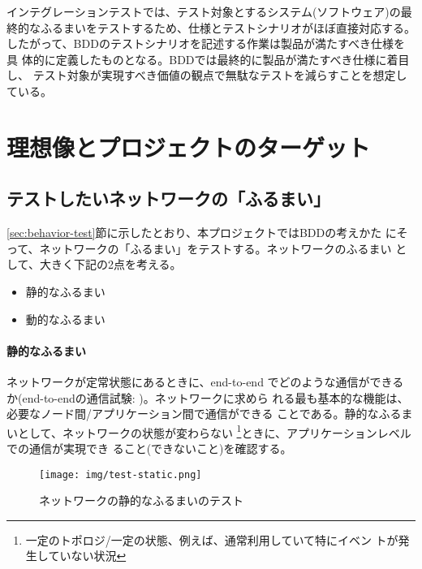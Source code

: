 インテグレーションテストでは、テスト対象とするシステム(ソフトウェア)の最
終的なふるまいをテストするため、仕様とテストシナリオがほぼ直接対応する。
したがって、BDDのテストシナリオを記述する作業は製品が満たすべき仕様を具
体的に定義したものとなる。BDDでは最終的に製品が満たすべき仕様に着目し、
テスト対象が実現すべき価値の観点で無駄なテストを減らすことを想定している。

 \section{理想像とプロジェクトのターゲット}
 \label{sec:desired-and-target}


  \subsection{テストしたいネットワークの「ふるまい」}
  \label{sec:behavior-to-test}

\ref{sec:behavior-test}節に示したとおり、本プロジェクトではBDDの考えかた
にそって、ネットワークの「ふるまい」をテストする。ネットワークのふるまい
として、大きく下記の2点を考える。
\begin{itemize}
 \item 静的なふるまい
 \item 動的なふるまい
\end{itemize}

    \paragraph{静的なふるまい}
ネットワークが定常状態にあるときに、end-to-end でどのような通信ができる
か(end-to-endの通信試験: )。ネットワークに求めら
れる最も基本的な機能は、必要なノード間/アプリケーション間で通信ができる
ことである。静的なふるまいとして、ネットワークの状態が変わらない
\footnote{一定のトポロジ/一定の状態、例えば、通常利用していて特にイベン
トが発生していない状況}ときに、アプリケーションレベルでの通信が実現でき
ること(できないこと)を確認する。
\begin{figure}[h]
 \centering
 \texttt{[image: img/test-static.png]}
 \caption{ネットワークの静的なふるまいのテスト}
 \label{fig:test-static}
\end{figure}

